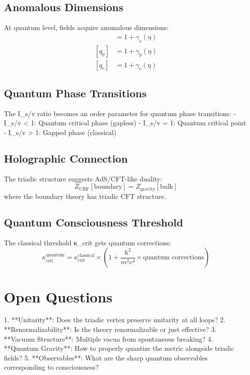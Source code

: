 \documentclass[openany]{memoir}
\theoremstyle{definition}
\theoremstyle{plain}
\theoremstyle{remark}
\begin{document}
\subsection{Anomalous Dimensions}
At quantum level, fields acquire anomalous dimensions:
\begin{align}
[q_s] &= 1 + \gamma_s(\eta) \\
[q_p] &= 1 + \gamma_p(\eta) \\
[q_c] &= 1 + \gamma_c(\eta)
\end{align}

\subsection{Quantum Phase Transitions}
The I_{s/v} ratio becomes an order parameter for quantum phase transitions:
- I_{s/v} < 1: Quantum critical phase (gapless)
- I_{s/v} = 1: Quantum critical point
- I_{s/v} > 1: Gapped phase (classical)

\subsection{Holographic Connection}
The triadic structure suggests AdS/CFT-like duality:
\begin{equation}
Z_{\text{URF}}[\text{boundary}] = Z_{\text{gravity}}[\text{bulk}]
\end{equation}
where the boundary theory has triadic CFT structure.

\subsection{Quantum Consciousness Threshold}
The classical threshold κ_{crit} gets quantum corrections:
\begin{equation}
\kappa_{\text{crit}}^{\text{quantum}} = \kappa_{\text{crit}}^{\text{classical}} \times \left(1 + \frac{\hbar^2}{m^2 c^4} \times \text{quantum corrections}\right)
\end{equation}

\section{Open Questions}

1. **Unitarity**: Does the triadic vertex preserve unitarity at all loops?
2. **Renormalizability**: Is the theory renormalizable or just effective?
3. **Vacuum Structure**: Multiple vacua from spontaneous breaking?
4. **Quantum Gravity**: How to properly quantize the metric alongside triadic fields?
5. **Observables**: What are the sharp quantum observables corresponding to consciousness?
\end{document}

